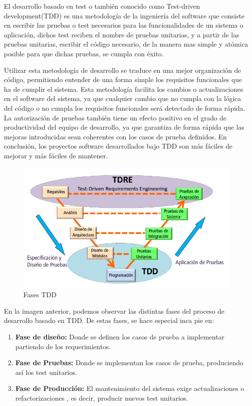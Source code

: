 \documentclass[a4paper,11pt]{book}
\begin{document}
El desarrollo basado en test o también conocido como Test-driven development\cite{tdd}(TDD) es una metodología de la ingeniería del software que consiste en escribir las pruebas o test necesarios para las funcionalidades de un sistema o aplicación, dichos test reciben el nombre de pruebas unitarias, y a partir de las pruebas unitarias, escribir el código necesario, de la manera mas simple y atómica posible para que dichas pruebas, se cumpla con éxito.  


Utilizar esta metodología de desarrollo se traduce en una mejor organización de código, permitiendo entender de una forma simple los requisitos funcionales que ha de cumplir el sistema. Esta metodología facilita los cambios o actualizaciones en el software del sistema, ya que cualquier cambio que no cumpla con la lógica del código o no cumpla los requisitos funcionales será detectado de forma rápida. La autorización de pruebas también tiene un efecto positivo en el grado de productividad del equipo de desarrollo, ya que garantiza de forma rápida que las mejoras introducidas sean coherentes con los casos de prueba definidos. En conclusión, los proyectos software desarrollados bajo TDD son más fáciles de mejorar y más fáciles de mantener. 

\begin{figure}[H] 
\centering 
\includegraphics[scale=0.45]{imagenes/desarrollo_herramienta/tdd.png}
\caption{ Fases TDD\cite{tdd2}  }  
\end{figure} 
	


En la imagen anterior, podemos observar las distintas fases del proceso de desarrollo basado en TDD. De estas fases, se hace especial inca pie en:

\begin{enumerate}
\item \textbf{Fase de diseño:} Donde se definen los casos de prueba a implementar partiendo de los requerimientos.

\item \textbf{Fase de Pruebas:} Donde se implementan los casos de prueba, produciendo así los test unitarios.

\item \textbf{Fase de Producción:} El mantenimiento del sistema exige actualizaciones o refactorizaciones , es decir, producir nuevos test unitarios. 
\end{enumerate}
\end{document}

